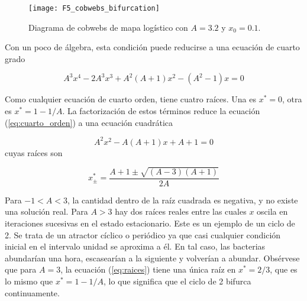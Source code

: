\begin{itemize}
                    \begin{figure}[hbtp]
                        \centering
                        \texttt{[image: F5\_cobwebs\_bifurcation]}
                        \caption{Diagrama de cobwebs de mapa logístico con $A = 3.2$ y $x_{0} = 0.1$.}
                        \label{fig:F5_cobwebs_bifurcation}
                    \end{figure}

                    Con un poco de álgebra, esta condición puede reducirse a una ecuación de cuarto grado

                    \begin{equation}
                        A^{3} x^{4} - 2 A^{3} x^{3} + A^{2} (A + 1) x^{2} - (A^{2} -1)x = 0
                        \label{eq:cuarto_orden}
                    \end{equation}

                    Como cualquier ecuación de cuarto orden, tiene cuatro raíces. Una es $x^{*} = 0$, otra es $x^{*} = 1 - 1/A$. La factorización de estos términos reduce la ecuación (\ref{eq:cuarto_orden}) a una ecuación cuadrática

                    \begin{equation}
                        A^{2} x^{2} - A (A + 1) x + A + 1 = 0
                        \label{eq:segundo_orden}
                    \end{equation}
                    cuyas raíces son

                    \begin{equation}
                        x_{\pm}^{*} = \frac{A + 1 \pm \sqrt{(A-3) (A + 1)} }{2A} 
                        \label{eq:raices}
                    \end{equation}

                    Para $-1 < A < 3$, la cantidad dentro de la raíz cuadrada es negativa, y no existe una solución real. Para $A > 3$ hay dos raíces reales entre las cuales $x$ oscila en iteraciones sucesivas en el estado estacionario. Este es un ejemplo de un ciclo de 2. Se trata de un atractor cíclico o periódico ya que casi cualquier condición inicial en el intervalo unidad se aproxima a él. En tal caso, las bacterias abundarían una hora, escasearían a la siguiente y volverían a abundar. Obsérvese que para $A = 3$, la ecuación (\ref{eq:raices}) tiene una única raíz en $x^{*} = 2/3$, que es lo mismo que $x^{*} = 1 - 1/A$, lo que significa que el ciclo de 2 bifurca continuamente. 


\end{itemize}
